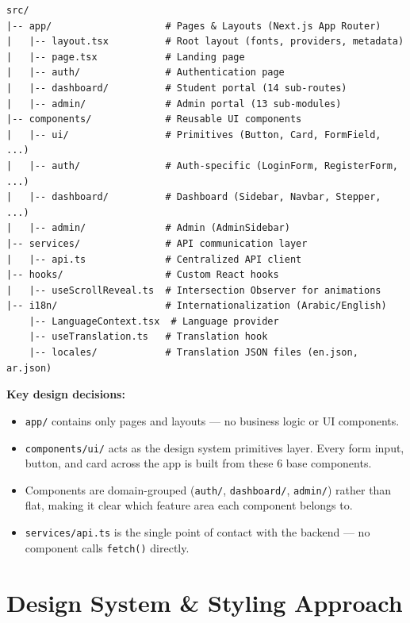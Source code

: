 \documentclass[12pt,a4paper]{article}
\begin{document}
\begin{lstlisting}[language={},title={Project folder structure}]
src/
|-- app/                    # Pages & Layouts (Next.js App Router)
|   |-- layout.tsx          # Root layout (fonts, providers, metadata)
|   |-- page.tsx            # Landing page
|   |-- auth/               # Authentication page
|   |-- dashboard/          # Student portal (14 sub-routes)
|   |-- admin/              # Admin portal (13 sub-modules)
|-- components/             # Reusable UI components
|   |-- ui/                 # Primitives (Button, Card, FormField, ...)
|   |-- auth/               # Auth-specific (LoginForm, RegisterForm, ...)
|   |-- dashboard/          # Dashboard (Sidebar, Navbar, Stepper, ...)
|   |-- admin/              # Admin (AdminSidebar)
|-- services/               # API communication layer
|   |-- api.ts              # Centralized API client
|-- hooks/                  # Custom React hooks
|   |-- useScrollReveal.ts  # Intersection Observer for animations
|-- i18n/                   # Internationalization (Arabic/English)
    |-- LanguageContext.tsx  # Language provider
    |-- useTranslation.ts   # Translation hook
    |-- locales/            # Translation JSON files (en.json, ar.json)
\end{lstlisting}

\textbf{Key design decisions:}
\begin{itemize}[leftmargin=2em]
    \item \texttt{app/} contains only pages and layouts — no business logic or UI components.
    \item \texttt{components/ui/} acts as the design system primitives layer. Every form input, button, and card across the app is built from these 6 base components.
    \item Components are domain-grouped (\texttt{auth/}, \texttt{dashboard/}, \texttt{admin/}) rather than flat, making it clear which feature area each component belongs to.
    \item \texttt{services/api.ts} is the single point of contact with the backend — no component calls \texttt{fetch()} directly.
\end{itemize}

\section{Design System \& Styling Approach}
\end{document}
